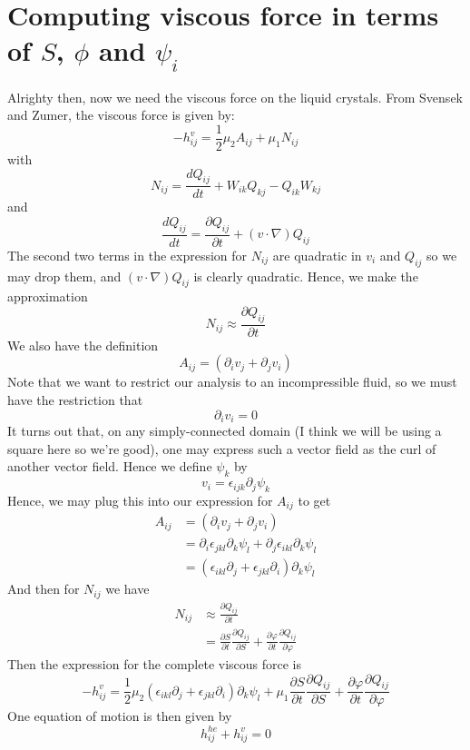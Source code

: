 \documentclass[leqno]{article}
\begin{document}
	\section*{Computing viscous force in terms of $S$, $\phi$ and $\psi_i$}
	Alrighty then, now we need the viscous force on the liquid crystals. From Svensek and Zumer, the viscous force is given by:
	\[
		-h^v_{ij} = \frac{1}{2} \mu_2 A_{ij} + \mu_1 N_{ij}
	\]
	with 
	\[
		N_{ij} = \frac{d Q_{ij}}{dt} + W_{ik} Q_{kj} - Q_{ik} W_{kj}
	\]
	and
	\[
		\frac{d Q_{ij}}{dt} = \frac{\partial Q_{ij}}{\partial t} + (v\cdot \nabla)Q_{ij}
	\]
	The second two terms in the expression for $N_{ij}$ are quadratic in $v_i$ and $Q_{ij}$ so we may drop them, and $(v\cdot \nabla)Q_{ij}$ is clearly quadratic. Hence, we make the approximation
	\[
		N_{ij} \approx \frac{\partial Q_{ij}}{\partial t}
	\]
	We also have the definition
	\[
		A_{ij} = (\partial_i v_j + \partial_j v_i)
	\]
	Note that we want to restrict our analysis to an incompressible fluid, so we must have the restriction that
	\[
		\partial_i v_i = 0
	\]
	It turns out that, on any simply-connected domain (I think we will be using a square here so we're good), one may express such a vector field as the curl of another vector field. Hence we define $\psi_k$ by
	\[
		v_i = \epsilon_{ijk} \partial_j \psi_k
	\]
	Hence, we may plug this into our expression for $A_{ij}$ to get
	\begin{align*}
		A_{ij} &= (\partial_i v_j + \partial_j v_i) \\
		&= \partial_i \epsilon_{jkl} \partial_k \psi_l + \partial_j \epsilon_{ikl} \partial_k \psi_l \\
		&= (\epsilon_{ikl} \partial_j + \epsilon_{jkl} \partial_i)\partial_k \psi_l
	\end{align*}
	And then for $N_{ij}$ we have
	\begin{align*}
		N_{ij} &\approx \frac{\partial Q_{ij}}{\partial t} \\
		&= \frac{\partial S}{\partial t} \frac{\partial Q_{ij}}{\partial S} + \frac{\partial \varphi}{\partial t} \frac{\partial Q_{ij}}{\partial \varphi}
	\end{align*}
	Then the expression for the complete viscous force is
	\[
		-h^v_{ij} = \frac{1}{2}\mu_2 (\epsilon_{ikl} \partial_j + \epsilon_{jkl} \partial_i)\partial_k \psi_l + \mu_1 \frac{\partial S}{\partial t} \frac{\partial Q_{ij}}{\partial S} + \frac{\partial \varphi}{\partial t} \frac{\partial Q_{ij}}{\partial \varphi}
	\]
	One equation of motion is then given by 
	\[
		h^{he}_{ij} + h^{v}_{ij} = 0
	\]
	
\end{document}

